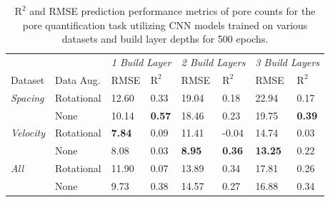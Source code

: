 \begin{table}
  \begin{tabular}{ll|ll|ll|ll}
    \hline
    \rowcolor{gray!30}
                        &                   & \multicolumn{2}{|l}{\textit{1 Build Layer}}   & \multicolumn{2}{|l}{\textit{2 Build Layers}}  & \multicolumn{2}{|l}{\textit{3 Build Layers}}  \\
    \rowcolor{gray!30}
    Dataset             & Data Aug. & RMSE            & $\text{R}^2$                & RMSE            & $\text{R}^2$                & RMSE            & $\text{R}^2$                \\
    \hline                                                                                                                      
    \textit{Spacing}    &  Rotational       & 12.60           & 0.33                        & 19.04           & 0.18                        & 22.94           & 0.17                        \\
                        &  None             & 10.14           & \textbf{0.57}               & 18.46           & 0.23                        & 19.75           & \textbf{0.39}               \\
    \rowcolor{gray!10}                                                                                                          
    \textit{Velocity}   &  Rotational       & \textbf{7.84}   & 0.09                        & 11.41           & -0.04                       & 14.74           & 0.03                        \\
    \rowcolor{gray!10}                                                                                                          
                        &  None             & 8.08            & 0.03                        & \textbf{8.95}   & \textbf{0.36}               & \textbf{13.25}  & 0.22                        \\
    \textit{All}        &  Rotational       & 11.90           & 0.07                        & 13.89           & 0.34                        & 17.81           & 0.26                        \\
                        &  None             & 9.73            & 0.38                        & 14.57           & 0.27                        & 16.88           & 0.34                        \\
    \hline
  \end{tabular}
  \caption{
    $\text{R}^2$ and RMSE prediction performance metrics of pore counts for the
    pore quantification task utilizing CNN models trained on various datasets
    and build layer depths for 500 epochs.
  }
  \label{tab:pore_count_cnn_results}
\end{table}

